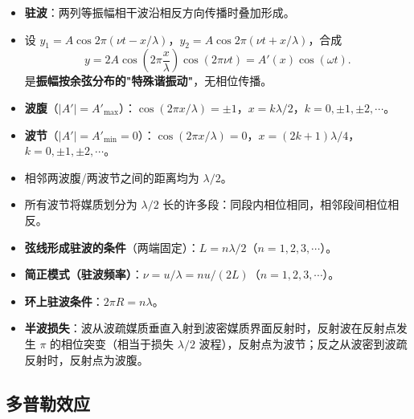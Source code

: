 \documentclass[12pt,a4paper]{ctexart}
\begin{document}
\begin{itemize}
    \item \textbf{驻波}：两列等振幅相干波沿相反方向传播时叠加形成。
    \item 设 $y_1 = A\cos 2\pi(\nu t - x/\lambda)$，$y_2 = A\cos 2\pi(\nu t + x/\lambda)$，合成
    \[
        y = 2A\cos\!\left(2\pi\frac{x}{\lambda}\right)\cos(2\pi\nu t) = A'(x)\cos(\omega t).
    \]
    是\textbf{振幅按余弦分布的"特殊谐振动"}，无相位传播。
    \item \textbf{波腹}（$|A'|=A'_{\max}$）：$\cos(2\pi x/\lambda)=\pm 1$，$x = k\lambda/2$，$k=0,\pm 1,\pm 2,\cdots$。
    \item \textbf{波节}（$|A'|=A'_{\min}=0$）：$\cos(2\pi x/\lambda)=0$，$x = (2k+1)\lambda/4$，$k=0,\pm 1,\pm 2,\cdots$。
    \item 相邻两波腹/两波节之间的距离均为 $\lambda/2$。
    \item 所有波节将媒质划分为 $\lambda/2$ 长的许多段：同段内相位相同，相邻段间相位相反。
    \item \textbf{弦线形成驻波的条件}（两端固定）：$L = n\lambda/2$（$n=1,2,3,\cdots$）。
    \item \textbf{简正模式（驻波频率）}：$\nu = u/\lambda = nu/(2L)$（$n=1,2,3,\cdots$）。
    \item \textbf{环上驻波条件}：$2\pi R = n\lambda$。
    \item \textbf{半波损失}：波从波疏媒质垂直入射到波密媒质界面反射时，反射波在反射点发生 $\pi$ 的相位突变（相当于损失 $\lambda/2$ 波程），反射点为波节；反之从波密到波疏反射时，反射点为波腹。
\end{itemize}

\subsection{多普勒效应}
\end{document}

